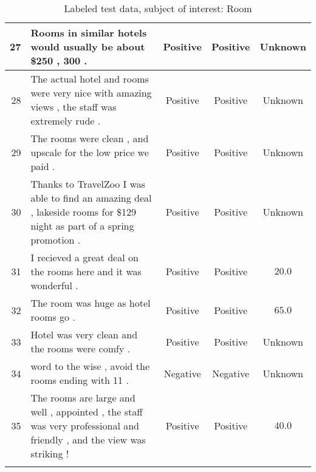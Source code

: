 \begin{landscape}
\begin{center}
\begin{longtable}{rm{9cm}ccc}
27 & Rooms in similar hotels would usually be about \$250 , 300 .
& Positive & Positive & Unknown \\ \hline
28 & The actual hotel and rooms were very nice with amazing views , the staff was extremely rude .
& Positive & Positive & Unknown \\ \hline
29 & The rooms were clean , and upscale for the low price we paid .
& Positive & Positive & Unknown \\ \hline
30 & Thanks to TravelZoo I was able to find an amazing deal , lakeside rooms for \$129 night as part of a spring promotion .
& Positive & Positive & Unknown \\ \hline
31 & I recieved a great deal on the rooms here and it was wonderful .
& Positive & Positive & $20.0$ \\ \hline
32 & The room was huge as hotel rooms go .
& Positive & Positive & $65.0$ \\ \hline
33 &Hotel was very clean and the rooms were comfy .
& Positive & Positive & Unknown \\ \hline
34 & word to the wise , avoid the rooms ending with 11 .
& Negative & Negative & Unknown \\ \hline
35 & The rooms are large and well , appointed , the staff was very professional and friendly , and the view was striking ! 
& Positive & Positive & $40.0$\\
\caption{Labeled test data, subject of interest: Room}
\label{table:labeling}
\end{longtable}
\end{center}
\end{landscape}

